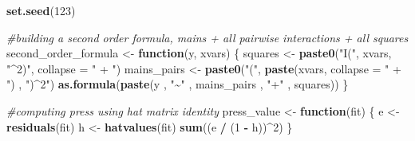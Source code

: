 \documentclass[
]{article}
\newenvironment{Shaded}{\begin{snugshade}}{\end{snugshade}}
\newcommand{\AttributeTok}[1]{\textcolor[rgb]{0.13,0.29,0.53}{#1}}
\newcommand{\CommentTok}[1]{\textcolor[rgb]{0.56,0.35,0.01}{\textit{#1}}}
\newcommand{\ControlFlowTok}[1]{\textcolor[rgb]{0.13,0.29,0.53}{\textbf{#1}}}
\newcommand{\DecValTok}[1]{\textcolor[rgb]{0.00,0.00,0.81}{#1}}
\newcommand{\FunctionTok}[1]{\textcolor[rgb]{0.13,0.29,0.53}{\textbf{#1}}}
\newcommand{\NormalTok}[1]{#1}
\newcommand{\OtherTok}[1]{\textcolor[rgb]{0.56,0.35,0.01}{#1}}
\newcommand{\SpecialCharTok}[1]{\textcolor[rgb]{0.81,0.36,0.00}{\textbf{#1}}}
\newcommand{\StringTok}[1]{\textcolor[rgb]{0.31,0.60,0.02}{#1}}
\begin{document}
\begin{Shaded}
\begin{Highlighting}[]
\FunctionTok{set.seed}\NormalTok{(}\DecValTok{123}\NormalTok{)}

\CommentTok{\#building a second order formula, mains + all pairwise interactions + all squares}
\NormalTok{second\_order\_formula }\OtherTok{\textless{}{-}} \ControlFlowTok{function}\NormalTok{(y, xvars)}
\NormalTok{\{}
\NormalTok{  squares }\OtherTok{\textless{}{-}} \FunctionTok{paste0}\NormalTok{(}\StringTok{"I("}\NormalTok{, xvars, }\StringTok{"\^{}2)"}\NormalTok{, }\AttributeTok{collapse =} \StringTok{" + "}\NormalTok{)}
\NormalTok{  mains\_pairs }\OtherTok{\textless{}{-}} \FunctionTok{paste0}\NormalTok{(}\StringTok{"("}\NormalTok{, }\FunctionTok{paste}\NormalTok{(xvars, }\AttributeTok{collapse =} \StringTok{" + "}\NormalTok{) , }\StringTok{")\^{}2"}\NormalTok{)}
  \FunctionTok{as.formula}\NormalTok{(}\FunctionTok{paste}\NormalTok{(y , }\StringTok{"\textasciitilde{}"}\NormalTok{ , mains\_pairs , }\StringTok{"+"}\NormalTok{ , squares))}
\NormalTok{\}}

\CommentTok{\#computing press using hat matrix identity}
\NormalTok{press\_value }\OtherTok{\textless{}{-}} \ControlFlowTok{function}\NormalTok{(fit)}
\NormalTok{\{}
\NormalTok{  e }\OtherTok{\textless{}{-}} \FunctionTok{residuals}\NormalTok{(fit)}
\NormalTok{  h }\OtherTok{\textless{}{-}} \FunctionTok{hatvalues}\NormalTok{(fit)}
  \FunctionTok{sum}\NormalTok{((e }\SpecialCharTok{/}\NormalTok{ (}\DecValTok{1} \SpecialCharTok{{-}}\NormalTok{ h))}\SpecialCharTok{\^{}}\DecValTok{2}\NormalTok{)}
\NormalTok{\}}


\end{Highlighting}
\end{Shaded}
\end{document}
